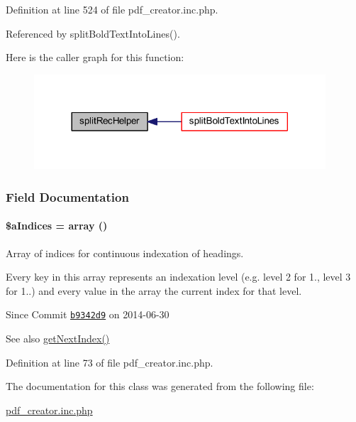 Definition at line 524 of file pdf\+\_\+creator.\+inc.\+php.



Referenced by split\+Bold\+Text\+Into\+Lines().



Here is the caller graph for this function\+:
\nopagebreak
\begin{figure}[H]
\begin{center}
\leavevmode
\includegraphics[width=308pt]{classoverview_p_d_f_af3f9a49de14251ba45bd046879f27aa2_icgraph}
\end{center}
\end{figure}




\subsubsection{Field Documentation}
\hypertarget{classoverview_p_d_f_a7d055132da646af2b192923c6a864e97}{
\paragraph[{\$a\+Indices}]{\setlength{\rightskip}{0pt plus 5cm}\$a\+Indices = array ()\hspace{0.3cm}{\ttfamily [private]}}}\label{classoverview_p_d_f_a7d055132da646af2b192923c6a864e97}


Array of indices for continuous indexation of headings. 

Every key in this array represents an indexation level (e.\+g. level 2 for 1., level 3 for 1..) and every value in the array the current index for that level.

\begin{DoxySince}{Since}
Commit \href{http://github.com/TheJake123/DrupalModul/commit/b9342d941b3f93e212f3f6af0823a07524dd5954}{\tt b9342d9} on 2014-\/06-\/30 
\end{DoxySince}
\begin{DoxySeeAlso}{See also}
\hyperlink{classoverview_p_d_f_aedc9466cae51e07e57ba865a69c92efc}{get\+Next\+Index()} 
\end{DoxySeeAlso}


Definition at line 73 of file pdf\+\_\+creator.\+inc.\+php.



The documentation for this class was generated from the following file\+:\begin{DoxyCompactItemize}
\item 
\hyperlink{pdf__creator_8inc_8php}{pdf\+\_\+creator.\+inc.\+php}\end{DoxyCompactItemize}
